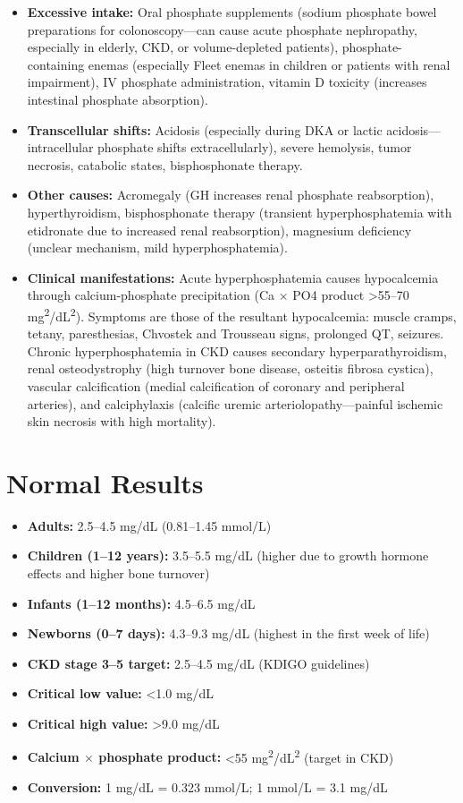 \begin{itemize}
  \item \textbf{Excessive intake:} Oral phosphate supplements (sodium phosphate bowel preparations for colonoscopy---can cause acute phosphate nephropathy, especially in elderly, CKD, or volume-depleted patients), phosphate-containing enemas (especially Fleet enemas in children or patients with renal impairment), IV phosphate administration, vitamin D toxicity (increases intestinal phosphate absorption).
  \item \textbf{Transcellular shifts:} Acidosis (especially during DKA or lactic acidosis---intracellular phosphate shifts extracellularly), severe hemolysis, tumor necrosis, catabolic states, bisphosphonate therapy.
  \item \textbf{Other causes:} Acromegaly (GH increases renal phosphate reabsorption), hyperthyroidism, bisphosphonate therapy (transient hyperphosphatemia with etidronate due to increased renal reabsorption), magnesium deficiency (unclear mechanism, mild hyperphosphatemia).
  \item \textbf{Clinical manifestations:} Acute hyperphosphatemia causes hypocalcemia through calcium-phosphate precipitation (Ca $\times$ PO4 product >55--70 mg\textsuperscript{2}/dL\textsuperscript{2}). Symptoms are those of the resultant hypocalcemia: muscle cramps, tetany, paresthesias, Chvostek and Trousseau signs, prolonged QT, seizures. Chronic hyperphosphatemia in CKD causes secondary hyperparathyroidism, renal osteodystrophy (high turnover bone disease, osteitis fibrosa cystica), vascular calcification (medial calcification of coronary and peripheral arteries), and calciphylaxis (calcific uremic arteriolopathy---painful ischemic skin necrosis with high mortality).
\end{itemize}

\section*{Normal Results}
\begin{itemize}
  \item \textbf{Adults:} 2.5--4.5 mg/dL (0.81--1.45 mmol/L)
  \item \textbf{Children (1--12 years):} 3.5--5.5 mg/dL (higher due to growth hormone effects and higher bone turnover)
  \item \textbf{Infants (1--12 months):} 4.5--6.5 mg/dL
  \item \textbf{Newborns (0--7 days):} 4.3--9.3 mg/dL (highest in the first week of life)
  \item \textbf{CKD stage 3--5 target:} 2.5--4.5 mg/dL (KDIGO guidelines)
  \item \textbf{Critical low value:} <1.0 mg/dL
  \item \textbf{Critical high value:} >9.0 mg/dL
  \item \textbf{Calcium $\times$ phosphate product:} <55 mg\textsuperscript{2}/dL\textsuperscript{2} (target in CKD)
  \item \textbf{Conversion:} 1 mg/dL = 0.323 mmol/L; 1 mmol/L = 3.1 mg/dL
\end{itemize}


